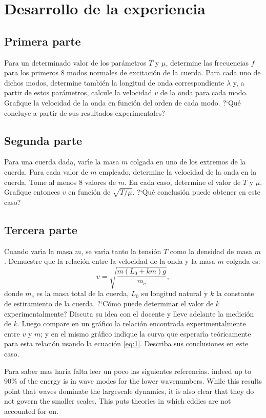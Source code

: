 \documentclass[laboratorio]{guia}
\begin{document}
\section{Desarrollo de la experiencia}

\subsection{Primera parte}
Para un determinado valor de los par\'ametros $T$ y $\mu$, determine las
frecuencias $f$ para los primeros 8 modos normales de excitaci\'on de la
cuerda. Para cada uno de dichos modos, determine tambi\'en la longitud de onda
correspondiente $\lambda$ y, a partir de estos par\'ametros, calcule la
velocidad $v$ de la onda para cada modo. Grafique la velocidad de la onda en
funci\'on del orden de cada modo. ?`Qu\'e concluye a partir de sus resultados
experimentales?

\subsection{Segunda parte}

Para una cuerda dada, var\'\i e la masa $m$ colgada en uno de los extremos de
la cuerda. Para cada valor de $m$ empleado, determine la velocidad de la onda
en la cuerda. Tome al menos 8 valores de $m$. En cada caso, determine el valor
de $T$ y $\mu$. Grafique entonces $v$ en funci\'on de $\sqrt{T/\mu}$. ?`Qu\'e
conclusi\'on puede obtener en este caso?

\subsection{Tercera parte}

Cuando var\'\i a la masa $m$, se var\'\i a tanto la tensi\'on $T$ como la
densidad de masa $m$. Demuestre que la relaci\'on entre la velocidad de la onda
y la masa $m$ colgada es:
\begin{equation}
    v = \sqrt{\frac{m (L_0 + k m)g}{m_c}},
    \label{eq:1}
\end{equation}
donde $m_c$ es la masa total de la cuerda, $L_0$ su longitud natural y $k$ la
constante de estiramiento de la cuerda. ?`C\'omo puede determinar el valor de $k$
experimentalmente? Discuta su idea con el docente y lleve adelante la
medici\'on de $k$. Luego compare en un gr\'afico la relaci\'on encontrada
experimentalmente entre $v$ y $m$; y en el mismo gr\'afico indique la curva que
esperar\'\i a te\'oricamente para esta relaci\'on usando la ecuaci\'on
\eqref{eq:1}. Describa sus conclusiones en este caso.



\begin{sabermas} Para saber mas haria falta leer un poco las siguientes
    referencias.  indeed up to 90\% of the energy is in wave modes for the
    lower wavenumbers. While this results point that waves dominate the
    largescale dynamics, it is also clear that they do not govern the smaller
    scales.  This puts theories in which eddies are not accounted for on.
\end{sabermas}

%  
\end{document}
